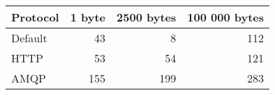 \begin{tabularx}{\textwidth}{lrrr}
\hline
 Protocol   &   1 byte &   2500 bytes &   100 000 bytes \\
\hline
 Default    &       43 &            8 &             112 \\
 HTTP       &       53 &           54 &             121 \\
 AMQP       &      155 &          199 &             283 \\
\hline
\end{tabularx}